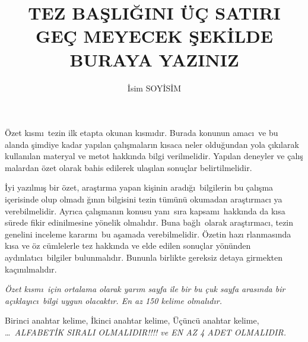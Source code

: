 \documentclass[fleqn,oneside]{akdenizuni}
\theoremstyle{plain}
\theoremstyle{definition}
\begin{document}
\title[KISA BA\c SLIK]{TEZ BA\c{S}LI\u{G}INI \"{U}\c{C} SATIRI GE\c{C}%
MEYECEK \c{S}EK\.{I}LDE BURAYA YAZINIZ}
\author[\.{I}. SOY\.{I}S\.{I}M]{\.{I}sim SOY\.{I}S\.{I}M}
\subject{Matemat\.\i k}
\maketitle

\begin{ozet}
\"{O}zet k\i sm\i\ tezin ilk etapta okunan k\i sm\i d\i r. Burada konunun
amac\i\ ve bu alanda \c{s}imdiye kadar yap\i lan \c{c}al\i \c{s}malar\i n
k\i saca neler oldu\u{g}undan yola \c{c}\i k\i larak kullan\i lan materyal
ve metot hakk\i nda bilgi verilmelidir. Yap\i lan deneyler ve \c{c}al\i \c{s}%
malardan \"{o}zet olarak bahis edilerek ula\c{s}\i lan sonu\c{c}lar
belirtilmelidir.

\.{I}yi yaz\i lm\i \c{s} bir \"{o}zet, ara\c{s}t\i rma yapan ki\c{s}inin
arad\i \u{g}\i\ bilgilerin bu \c{c}al\i \c{s}ma i\c{c}erisinde olup olmad\i 
\u{g}\i n\i n bilgisini tezin t\"{u}m\"{u}n\"{u} okumadan ara\c{s}t\i rmac\i
ya verebilmelidir. Ayr\i ca \c{c}al\i \c{s}man\i n konusu yan\i\ s\i ra
kapsam\i\ hakk\i nda da k\i sa s\"{u}rede fikir edinilmesine y\"{o}nelik
olmal\i d\i r. Buna ba\u{g}l\i\ olarak ara\c{s}t\i rmac\i , tezin genelini
inceleme karar\i n\i\ bu a\c{s}amada verebilmelidir. \"{O}zetin haz\i
rlanmas\i nda k\i sa ve \"{o}z c\"{u}mlelerle tez hakk\i nda ve elde edilen
sonu\c{c}lar y\"{o}n\"{u}nden ayd\i nlat\i c\i\ bilgiler bulunmal\i d\i r.
Bununla birlikte gereksiz detaya girmekten ka\c{c}\i n\i lmal\i d\i r.

\emph{\"{O}zet k\i sm\i\ i\c{c}in ortalama olarak yar\i m sayfa ile bir bu%
\c{c}uk sayfa aras\i nda bir a\c{c}\i klay\i c\i\ bilgi uygun olacakt\i r.
En az 150 kelime olmal\i d\i r.}

\begin{labeledminipage}
Birinci anahtar kelime, \.{I}kinci anahtar kelime, \"{U}\c{c}\"{u}nc\"{u}
anahtar kelime, \dots\ \emph{ALFABET\.{I}K SIRALI OLMALIDIR!!!! ve EN AZ 4
ADET OLMALIDIR.}
\end{labeledminipage}
\end{ozet}
\end{document}
